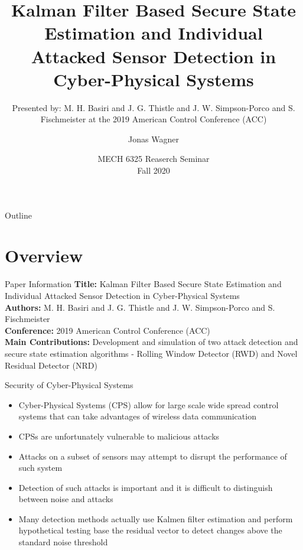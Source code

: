 \documentclass[aspectratio=169]{beamer}
\title[Kalman Filter Based Secure State Estimation]{Kalman Filter Based Secure State Estimation and Individual Attacked Sensor Detection in Cyber-Physical Systems\cite{SecureStateEstimation}}
\subtitle{Presented by: M. H. {Basiri} and J. G. {Thistle} and J. W. {Simpson-Porco} and S. {Fischmeister} at the 2019 American Control Conference (ACC)}
\author{Jonas Wagner}
\date[MECH 6325 - Fall 2020]{MECH 6325 Reaserch Seminar\\ Fall 2020}
\begin{document}
	
\begin{frame}
	\titlepage
\end{frame}


\begin{frame}{Outline}
	\tableofcontents
\end{frame}

\section{Overview}

\begin{frame}{Paper Information} %
    \textbf{Title:} Kalman Filter Based Secure State Estimation and Individual Attacked Sensor Detection in Cyber-Physical Systems\\
    \vspace{10 pt}
    \textbf{Authors:} M. H. {Basiri} and J. G. {Thistle} and J. W. {Simpson-Porco} and S. {Fischmeister}\\
    \vspace{10 pt}
    \textbf{Conference:} 2019 American Control Conference (ACC)\\
    \vspace{10 pt}
    \textbf{Main Contributions:} Development and simulation of two attack detection and secure state estimation algorithms - Rolling Window Detector (RWD) and Novel Residual Detector (NRD)
\end{frame}

\begin{frame}{Security of Cyber-Physical Systems}
	\begin{itemize}
		\setlength \itemsep{1em}
		\item Cyber-Physical Systems (CPS) allow for large scale wide spread control systems that can take advantages of wireless data communication
		\item CPSs are unfortunately vulnerable to malicious attacks
		\item Attacks on a subset of sensors may attempt to disrupt the performance of such system
		\item Detection of such attacks is important and it is difficult to distinguish between noise and attacks
		\item Many detection methods actually use Kalmen filter estimation and perform hypothetical testing base the residual vector to detect changes above the standard noise threshold
	\end{itemize}
\end{frame}
\end{document}
